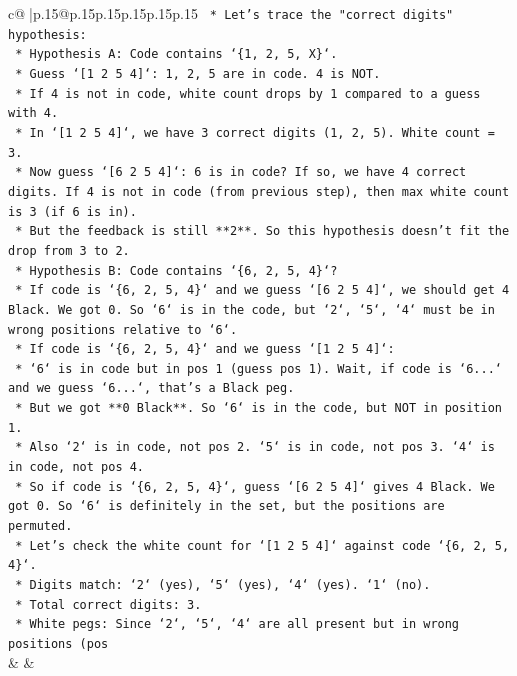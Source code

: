 \documentclass{article}
\begin{document}
{\begin{supertabular}{c@{$\;$}|p{.15\linewidth}@{}p{.15\linewidth}p{.15\linewidth}p{.15\linewidth}p{.15\linewidth}p{.15\linewidth}}
{{{\texttt{    *   Let's trace the "correct digits" hypothesis:} \\
\texttt{        *   Hypothesis A: Code contains `\{1, 2, 5, X\}`.} \\
\texttt{            *   Guess `{[}1 2 5 4{]}`: 1, 2, 5 are in code. 4 is NOT.} \\
\texttt{                *   If 4 is not in code, white count drops by 1 compared to a guess with 4.} \\
\texttt{                *   In `{[}1 2 5 4{]}`, we have 3 correct digits (1, 2, 5). White count = 3.} \\
\texttt{            *   Now guess `{[}6 2 5 4{]}`: 6 is in code? If so, we have 4 correct digits. If 4 is not in code (from previous step), then max white count is 3 (if 6 is in).} \\
\texttt{            *   But the feedback is still **2**. So this hypothesis doesn't fit the drop from 3 to 2.} \\
\texttt{        *   Hypothesis B: Code contains `\{6, 2, 5, 4\}`?} \\
\texttt{            *   If code is `\{6, 2, 5, 4\}` and we guess `{[}6 2 5 4{]}`, we should get 4 Black. We got 0. So `6` is in the code, but `2`, `5`, `4` must be in wrong positions relative to `6`.} \\
\texttt{            *   If code is `\{6, 2, 5, 4\}` and we guess `{[}1 2 5 4{]}`:} \\
\texttt{                *   `6` is in code but in pos 1 (guess pos 1). Wait, if code is `6...` and we guess `6...`, that's a Black peg.} \\
\texttt{                *   But we got **0 Black**. So `6` is in the code, but NOT in position 1.} \\
\texttt{                *   Also `2` is in code, not pos 2. `5` is in code, not pos 3. `4` is in code, not pos 4.} \\
\texttt{                *   So if code is `\{6, 2, 5, 4\}`, guess `{[}6 2 5 4{]}` gives 4 Black. We got 0. So `6` is definitely in the set, but the positions are permuted.} \\
\texttt{                *   Let's check the white count for `{[}1 2 5 4{]}` against code `\{6, 2, 5, 4\}`.} \\
\texttt{                    *   Digits match: `2` (yes), `5` (yes), `4` (yes). `1` (no).} \\
\texttt{                    *   Total correct digits: 3.} \\
\texttt{                    *   White pegs: Since `2`, `5`, `4` are all present but in wrong positions (pos} \\
            }
        }
    }
    & & \\ \\


\end{supertabular}}
\end{document}
